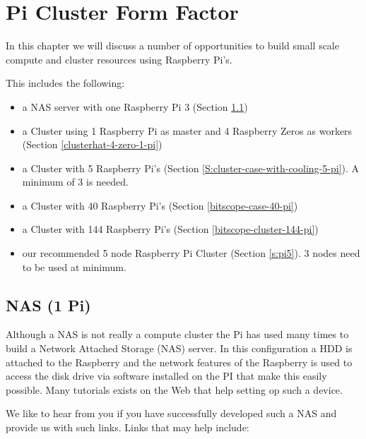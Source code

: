
\chapter{Pi Cluster Form Factor}\label{c:pi-cluster-form-factor}


In this chapter we will discuss a number of opportunities to build
small scale compute and cluster resources using Raspberry Pi's.

This includes the following:

\begin{itemize}

\item a NAS server with one Raspberry Pi 3 (Section \ref{nas-1-pi})

\item a Cluster using 1 Raspberry Pi as master and 4 Raspberry Zeros
  as workers (Section \ref{clusterhat-4-zero-1-pi})

\item a Cluster with 5 Raspberry Pi's (Section
  \ref{S:cluster-case-with-cooling-5-pi}). A minimum of 3 is needed.

\item a Cluster with 40 Raspberry Pi's (Section
  \ref{bitscope-case-40-pi})

\item a Cluster with 144 Raspberry Pi's (Section
  \ref{bitscope-cluster-144-pi})

\item our recommended 5 node Raspberry Pi Cluster (Section
  \ref{s:pi5}). 3 nodes need to be used at minimum. 
 

\end{itemize}

\section{NAS (1 Pi)}\label{nas-1-pi}

Although a NAS is not really a compute cluster the Pi has used many
times to build a Network Attached Storage (NAS) server. In this
configuration a HDD is attached to the Raspberry and the network
features of the Raspberry is used to access the disk drive via
software installed on the PI that make this easily possible. Many
tutorials exists on the Web that help setting op such a device.

We like to hear from you if you have successfully developed such a NAS
and provide us with such links. Links that may help include:

